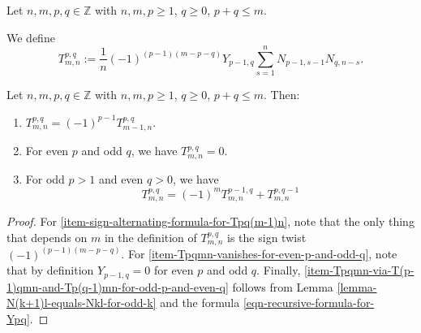 \documentclass[12pt,a4paper,reqno]{amsart}
\begin{document}
\begin{defn}
Let $n,m,p,q \in \mathbb{Z}$ with $n, m, p \geq 1$, $q \geq 0$, $p+q \leq m$. 

We define
$$ T^{p,q}_{m,n} := \frac{1}{n} (-1)^{(p-1)(m-p-q)} Y_{p-1,q}
\sum_{s=1}^n N_{p-1,s-1} N_{q,n-s}. $$
\end{defn}

\begin{lemma}
\label{lemma-technical-results-on-Tpqmn}
Let $n,m,p,q \in \mathbb{Z}$ with $n, m, p \geq 1$, $q \geq 0$, $p+q \leq m$. 
Then:
\begin{enumerate}
\item 
\label{item-sign-alternating-formula-for-Tpq(m-1)n}
$T^{p,q}_{m,n} = (-1)^{p-1} T^{p,q}_{m-1,n}$.  
\item 
\label{item-Tpqmn-vanishes-for-even-p-and-odd-q}
For even $p$ and odd $q$, we have $T^{p,q}_{m,n} = 0$.  
\item 
\label{item-Tpqmn-via-T(p-1)qmn-and-Tp(q-1)mn-for-odd-p-and-even-q}
For odd $p > 1$ and even $q > 0$, we have 
\begin{equation}
T^{p,q}_{m,n} = (-1)^{m} T^{p-1,q}_{m,n} + T^{p,q-1}_{m,n}
\end{equation}
\end{enumerate}
\end{lemma}
\begin{proof}
For \eqref{item-sign-alternating-formula-for-Tpq(m-1)n}, note that 
the only thing that depends on $m$ in the definition of
$T^{p,q}_{m,n}$ is the sign twist $(-1)^{(p-1)(m-p-q)}$. For 
\eqref{item-Tpqmn-vanishes-for-even-p-and-odd-q}, note that by
definition $Y_{p-1,q} = 0$ for even $p$ and odd $q$. Finally, 
\eqref{item-Tpqmn-via-T(p-1)qmn-and-Tp(q-1)mn-for-odd-p-and-even-q}
follows from Lemma \ref{lemma-N(k+1)l-equals-Nkl-for-odd-k}
and the formula \eqref{eqn-recursive-formula-for-Ypq}. 
\end{proof}
\end{document}
